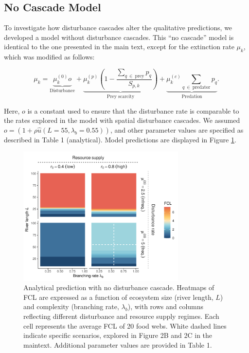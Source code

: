 \documentclass[11pt, class=article, crop=false]{standalone}
\begin{document}
\newpage

\subsection{No Cascade Model}

To investigate how disturbance cascades alter the qualitative predictions, we developed a model without disturbance cascades.
This ``no cascade'' model is identical to the one presented in the main text, except for the extinction rate $\mu_k$, which was modified as follows:

\begin{equation}
    \mu_{k} = 
        \underbrace{\mu_{k}^{(0)} o}_{\text{Disturbance}} + 
        \underbrace{\mu_{k}^{(p)} \left(1 - \frac{\sum_{q~\in~\text{prey}} p_{q}}{S_{p, k}} \right)}_{\text{Prey scarcity}} + 
        \underbrace{\mu_{k}^{(c)} \sum_{q~\in~\text{predator}} p_{q}}_{\text{Predation}}.
    \label{eq:extn}    
\end{equation}

Here, $o$ is a constant used to ensure that the disturbance rate is comparable to the rates explored in the model with spatial disturbance cascades.
We assumed $o = (1 + \rho \hat{u}(L = 55, \lambda_b = 0.55))$, and other parameter values are specified as described in Table 1 (analytical).
Model predictions are displayed in Figure \ref{fig:no-cascade}.

\begin{figure}
\centering
\includegraphics[width=0.75\textwidth]{../data_fmt/fig_rho0.pdf}
\caption{Analytical prediction with no disturbance cascade. Heatmaps of
FCL are expressed as a function of ecosystem size (river length, \(L\))
and complexity (branching rate, \(\lambda_b\)), with rows and columns
reflecting different disturbance and resource supply regimes. Each cell
represents the average FCL of 20 food webs. White dashed lines indicate
specific scenarios, explored in Figure 2B and 2C in the maintext.
Additional parameter values are provided in Table 1.}
\label{fig:no-cascade}
\end{figure}
\end{document}
